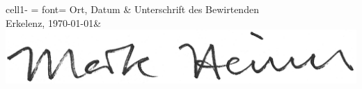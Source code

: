 \documentclass[12pt,a4paper]{scrartcl}
\begin{document}
\vspace{1cm}

\noindent
\begin{tblr}{
    cell{1}{-} = {font=\bfseries}
    }
Ort, Datum \hspace{4cm}     & Unterschrift des Bewirtenden\\
    Erkelenz, \today           & \includegraphics[scale=1,align=c]{./include/markheines.png}\\
\end{tblr}
\end{document}
